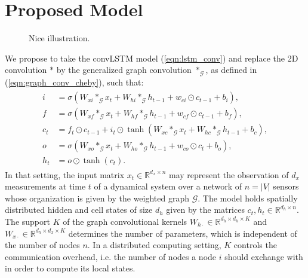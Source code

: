 \documentclass{article} %
\newcommand{\R}{\mathbb{R}}
\newcommand{\G}{\mathcal{G}}
\newcommand{\eqnref}[1]{(\ref{eqn:#1})}
\newcommand{\todo}[1]{{\color{red} #1 }}
\begin{document}
\section{Proposed Model}


\begin{figure}[ht]
	\centering
	\fbox{\rule[-.5cm]{0cm}{5cm} \rule[-.5cm]{\linewidth}{0cm}}
	\caption{\todo{Nice illustration.}}
\end{figure}

We propose to take the convLSTM model \eqnref{lstm_conv} and replace the 2D
convolution $\ast$ by the generalized graph convolution $\ast_\G$, as defined
in \eqnref{graph_conv_cheby}, such that:
\begin{align} \label{eqn:lstm_graph}
\begin{split}
	i &= \sigma(W_{xi} \ast_\G x_t + W_{hi} \ast_\G h_{t-1} + w_{ci} \odot c_{t-1} + b_i), \\
	f &= \sigma(W_{xf} \ast_\G x_t + W_{hf} \ast_\G h_{t-1} + w_{cf} \odot c_{t-1} + b_f), \\
	c_t &= f_t \odot c_{t-1} + i_t \odot \tanh(W_{xc} \ast_\G x_t + W_{hc} \ast_\G h_{t-1} + b_c), \\
	o &= \sigma(W_{xo} \ast_\G x_t + W_{ho} \ast_\G h_{t-1} + w_{co} \odot c_t + b_o), \\
	h_t &= o \odot \tanh(c_t).
\end{split}
\end{align}
In that setting, the input matrix $x_t \in \R^{d_x \times n}$ may represent the
observation of $d_x$ measurements at time $t$ of a dynamical system over a
network of $n = |V|$ sensors whose organization is given by the weighted graph
$\G$. The model holds spatially distributed hidden and cell states of size
$d_h$ given by the matrices $c_t, h_t \in \R^{d_h \times n}$. The support $K$
of the graph convolutional kernels $W_{h\cdot} \in \R^{d_h \times d_h \times
K}$ and $W_{x\cdot} \in \R^{d_h \times d_x \times K}$ determines the number of
parameters, which is independent of the number of nodes $n$. In a distributed
computing setting, $K$ controls the communication overhead, i.e. the number of
nodes a node $i$ should exchange with in order to compute its local states.
\end{document}
